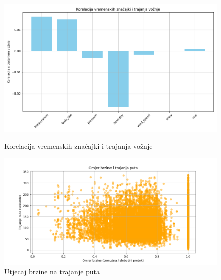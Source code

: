 \documentclass[seminarskirad]{fer}
\begin{document}
\begin{figure}[h!]
	\centering
	\begin{minipage}{0.48\textwidth}
		\centering
		\includegraphics[width=\textwidth]{Figures/vrijeme_korelacija.png}
		\caption{Korelacija vremenskih značajki i trajanja vožnje}
		\label{fig:korelacije_vrijeme}
	\end{minipage}
	\hfill
	\begin{minipage}{0.48\textwidth}
		\centering
		\includegraphics[width=\textwidth]{Figures/brzina_trajanje.png}
		\caption{Utjecaj brzine na trajanje puta}
		\label{fig:brzina_trajanje}
	\end{minipage}
\end{figure}

\end{document}
